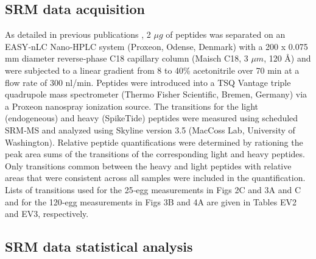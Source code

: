 \subsection{SRM data acquisition}

As detailed in previous publications \cite{Abell2011,Ahrends2014}, 2 $\mu g$ of peptides was separated on an EASY‐nLC Nano‐HPLC system (Proxeon, Odense, Denmark) with a 200 x 0.075 mm diameter reverse‐phase C18 capillary column (Maisch C18, 3 $\mu m$, 120 \si{\angstrom}) and were subjected to a linear gradient from 8 to 40\% acetonitrile over 70 min at a flow rate of 300 nl/min. Peptides were introduced into a TSQ Vantage triple quadrupole mass spectrometer (Thermo Fisher Scientific, Bremen, Germany) via a Proxeon nanospray ionization source. The transitions for the light (endogeneous) and heavy (SpikeTide) peptides were measured using scheduled SRM‐MS and analyzed using Skyline version 3.5 (MacCoss Lab, University of Washington). Relative peptide quantifications were determined by rationing the peak area sums of the transitions of the corresponding light and heavy peptides. Only transitions common between the heavy and light peptides with relative areas that were consistent across all samples were included in the quantification. Lists of transitions used for the 25‐egg measurements in Figs 2C and 3A and C and for the 120‐egg measurements in Figs 3B and 4A are given in Tables EV2 and EV3, respectively.

\subsection{SRM data statistical analysis}

